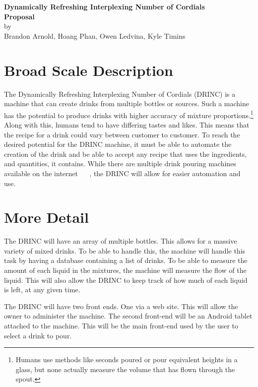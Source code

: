 \documentclass[letterpaper]{article}
\newcommand{\theTitle}{Dynamically Refreshing Interplexing Number of Cordials}
\newcommand{\subTitle}{DRINC}
\newcommand{\fNames}{Brandon Arnold, Hoang Phan, Owen Ledvina, Kyle Timins}
\begin{document}
\thispagestyle{plain}
\begin{center}
{\LARGE \textbf{\theTitle}}\\\vspace{0.5cm}
{\Large \textbf{Proposal}}\\\vspace{0.5cm}
by\\
{\large \fNames}

\end{center}

\section{Broad Scale Description}

The \theTitle{} (\subTitle{}) is a machine that can create drinks from
multiple bottles or sources. Such a machine has the potential to produce
drinks with higher accuracy of mixture proportions.\footnote{Humans use
methods like seconds poured or pour equivalent heights in a glass, but 
none actually measure the volume that has flown through the spout.} Along
with this, humans tend to have differing tastes and likes. This means
that the recipe for a drink could vary between customer to customer.
To reach the desired potential for the \subTitle{} machine, it must be 
able to automate the creation of the drink and be able to accept any recipe
that uses the ingredients, and quantities, it contains. While there are
multiple drink pouring machines available on the internet ~\cite{BaR2D2}
~\cite{Inebriator}, the \subTitle{} will allow for easier automation and
use.


\section{More Detail} %

The \subTitle{} will have an array of multiple bottles. This allows for
a massive variety of mixed drinks. To be able to handle this, the machine
will handle this task by having a database containing a list of drinks. 
To be able to measure the amount of each liquid in the mixtures, the 
machine will measure the flow of the liquid. This will also allow the 
\subTitle{} to keep track of how much of each liquid is left, at any given
time.

The \subTitle{} will have two front ends. One via a web site. This will
allow the owner to administer the machine. The second front-end will be
an Android tablet attached to the machine. This will be the main front-end
used by the user to select a drink to pour.
\end{document}
